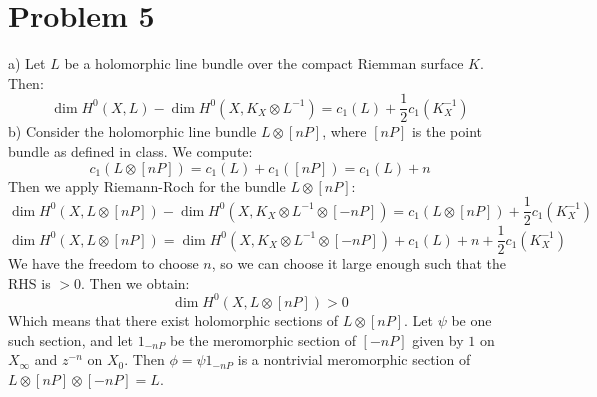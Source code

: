 \documentclass[12 pt]{article}
\theoremstyle{plain}
\theoremstyle{definition}
\theoremstyle{remark}
\begin{document}
\section*{Problem 5}
a) Let $L$ be a holomorphic line bundle over the compact Riemman surface $K$. Then:
\[         \dim H^0(X,L) - \dim H^0 (X, K_X \otimes L^{-1}) = c_1(L) + \frac{1}{2} c_1(K_X^{-1})       \]
b) Consider the holomorphic line bundle $L\otimes [nP]$, where $[nP]$ is the point bundle as defined in class. We compute:
\[      c_1(L\otimes [nP]) = c_1(L) + c_1([nP])  = c_1(L) + n    \]
Then we apply Riemann-Roch for the bundle $L\otimes [nP]$:
\[          \dim H^0(X,L\otimes [nP]) - \dim H^0 (X, K_X \otimes L^{-1} \otimes [-nP]) = c_1(L\otimes [nP]) + \frac{1}{2} c_1(K_X^{-1})      \]
\[           \dim H^0(X,L\otimes [nP]) = \dim H^0 (X, K_X \otimes L^{-1} \otimes [-nP]) + c_1(L) + n + \frac{1}{2} c_1(K_X^{-1})      \]
We have the freedom to choose $n$, so we can choose it large enough such that the RHS is $>0$. Then we obtain:
\[       \dim H^0(X,L\otimes [nP]) > 0      \]
Which means that there exist holomorphic sections of $L\otimes [nP]$. Let $\psi$ be one such section, and let $1_{-nP}$ be the meromorphic section of $[-nP]$ given by $1$ on $X_{\infty}$ and $z^{-n}$ on $X_0$. Then $\phi = \psi  1_{-nP}$ is a nontrivial meromorphic section of $L\otimes [nP] \otimes [-nP] = L$. 
\end{document}
